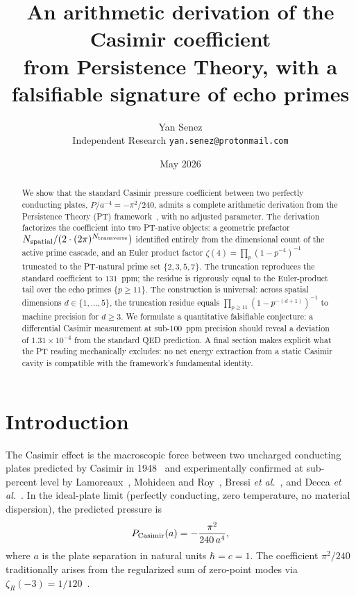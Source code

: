 \documentclass[11pt,a4paper]{article}
\title{\textbf{An arithmetic derivation of the Casimir coefficient}\\
       {\large from Persistence Theory, with a falsifiable signature of echo primes}}
\author{Yan Senez \\ {\small Independent Research \quad \texttt{yan.senez@protonmail.com}}}
\date{May 2026}
\newcommand{\zetaR}{\zeta_R}
\newcommand{\PTset}{\{2,3,5,7\}}
\newcommand{\echoes}{\{p \geq 11\}}
\newcommand{\Nspatial}{N_{\rm spatial}}
\newcommand{\Ntrans}{N_{\rm transverse}}
\begin{document}
\maketitle

\begin{abstract}
We show that the standard Casimir pressure coefficient between two perfectly conducting plates,
$P/a^{-4} = -\pi^{2}/240$, admits a complete arithmetic derivation from the Persistence Theory
(PT) framework~\cite{Senez2026}, with no adjusted parameter. The derivation factorizes the
coefficient into two PT-native objects: a geometric prefactor
$\Nspatial / (2 \cdot (2\pi)^{\Ntrans})$ identified entirely from the dimensional count of the
active prime cascade, and an Euler product factor $\zeta(4) = \prod_{p}(1-p^{-4})^{-1}$
truncated to the PT-natural prime set $\PTset$. The truncation reproduces the standard
coefficient to $131$~ppm; the residue is rigorously equal to the Euler-product tail over the
echo primes $\echoes$. The construction is universal: across spatial dimensions
$d \in \{1,\ldots,5\}$, the truncation residue equals $\prod_{p \geq 11}(1-p^{-(d+1)})^{-1}$
to machine precision for $d \geq 3$. We formulate a quantitative falsifiable conjecture: a
differential Casimir measurement at sub-100~ppm precision should reveal a deviation of
$1.31 \times 10^{-4}$ from the standard QED prediction. A final section makes explicit what the
PT reading mechanically excludes: no net energy extraction from a static Casimir cavity is
compatible with the framework's fundamental identity.
\end{abstract}

\section{Introduction}

The Casimir effect is the macroscopic force between two uncharged conducting plates predicted by
Casimir in 1948~\cite{Casimir1948} and experimentally confirmed at sub-percent level by
Lamoreaux~\cite{Lamoreaux1997}, Mohideen and Roy~\cite{Mohideen1998},
Bressi \emph{et al.}~\cite{Bressi2002}, and Decca \emph{et al.}~\cite{Decca2003,Decca2007}. In the
ideal-plate limit (perfectly conducting, zero temperature, no material dispersion), the predicted
pressure is
\begin{equation}
P_{\rm Casimir}(a) = -\frac{\pi^{2}}{240\,a^{4}},
\label{eq:standard-coefficient}
\end{equation}
where $a$ is the plate separation in natural units $\hbar = c = 1$. The coefficient
$\pi^{2}/240$ traditionally arises from the regularized sum of zero-point modes via
$\zetaR(-3) = 1/120$~\cite{Mostepanenko2009,Milton2001}.
\end{document}
